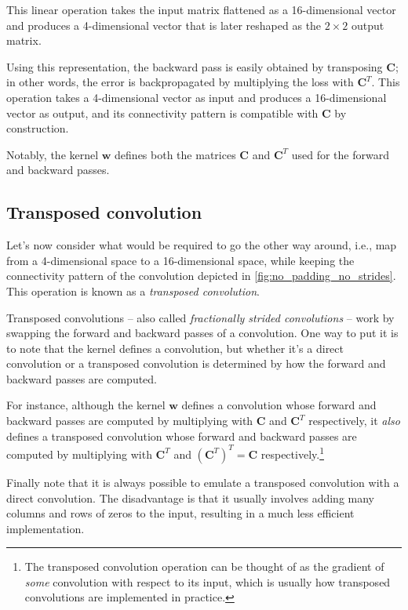 This linear operation takes the input matrix flattened as a 16-dimensional
vector and produces a 4-dimensional vector that is later reshaped as the $2
\times 2$ output matrix.

Using this representation, the backward pass is easily obtained by transposing
$\mathbf{C}$; in other words, the error is backpropagated by multiplying the
loss with $\mathbf{C}^T$. This operation takes a 4-dimensional vector as input
and produces a 16-dimensional vector as output, and its connectivity pattern is
compatible with $\mathbf{C}$ by construction.

Notably, the kernel $\mathbf{w}$ defines both the matrices $\mathbf{C}$ and
$\mathbf{C}^T$ used for the forward and backward passes.

\subsection{Transposed convolution}

Let's now consider what would be required to go the other way around, i.e., map
from a 4-dimensional space to a 16-dimensional space, while keeping the
connectivity pattern of the convolution depicted in
\autoref{fig:no_padding_no_strides}. This operation is known as a {\em
transposed convolution}.

Transposed convolutions -- also called {\em fractionally strided convolutions\/}
-- work by swapping the forward and backward passes of a convolution. One way to
put it is to note that the kernel defines a convolution, but whether it's a
direct convolution or a transposed convolution is determined by how the forward
and backward passes are computed.

For instance, although the kernel $\mathbf{w}$ defines a convolution whose
forward and backward passes are computed by multiplying with $\mathbf{C}$ and
$\mathbf{C}^T$ respectively, it {\em also\/} defines a transposed convolution
whose forward and backward passes are computed by multiplying with
$\mathbf{C}^T$ and $(\mathbf{C}^T)^T = \mathbf{C}$ respectively.\footnote{The
    transposed convolution operation can be thought of as the gradient of {\em
    some\/} convolution with respect to its input, which is usually how
    transposed convolutions are implemented in practice.}

Finally note that it is always possible to emulate a transposed convolution with
a direct convolution. The disadvantage is that it usually involves adding many
columns and rows of zeros to the input, resulting in a much less efficient
implementation.

